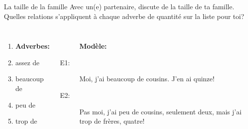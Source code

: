 \begin{frame}{La taille de la famille}
  Avec un(e) partenaire, discute de la taille  de ta famille.
  Quelles relations s'appliquent à chaque adverbe de quantité sur la liste pour toi?
  \begin{columns}
      \begin{enumerate}
        \item[] \textbf{Adverbes:}
        \item assez de
        \item beaucoup de
        \item peu de
        \item trop de
      \end{enumerate}
      \begin{description}
        \item[] \textbf{Modèle:}
        \item[E1:] Moi, j'ai \alert{beaucoup de} cousins. J'en ai quinze!
        \item[E2:] Pas moi, j'ai \alert{peu de} cousins, seulement deux, mais j'ai \alert{trop de} frères, quatre!
      \end{description}
  \end{columns}
\end{frame}